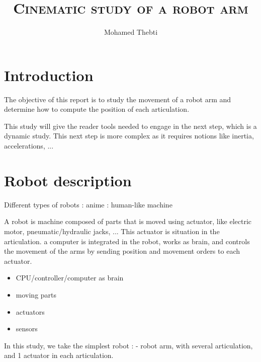 \documentclass[12pt,a4paper]{article}
\title{
	\Huge\textsc{Cinematic study of a robot arm}
}
\author{Mohamed Thebti}
\begin{document}
\setlength{\parindent}{0mm}

\fancyhead[R]{\slshape \leftmark}

\fancyfoot[C]{}
\fancyfoot[R]{\thepage}

\maketitle
\newpage

\tableofcontents

\newpage



\section{Introduction}


The objective of this report is to study the movement of a robot arm and determine how to compute the position of each articulation. 

This study will give the reader tools needed to engage in the next step, which is a dynamic study. This next step is more complex as it requires notions like inertia, accelerations, ...

\newpage
\section{Robot description}
Different types of robots : anime : human-like machine

A robot is machine composed of parts that is moved using actuator, like electric motor, pneumatic/hydraulic jacks, ...
This actuator is situation in the articulation. 
a computer is integrated in the robot, works as brain, and controls the movement of the arms by sending position and movement orders to each actuator. 
\begin{itemize}
	\item CPU/controller/computer as brain
	\item moving parts
	\item actuators
	\item sensors
\end{itemize}

In this study, we take the simplest robot : 
- robot arm, with several articulation, and 1 actuator in each articulation.
\end{document}
